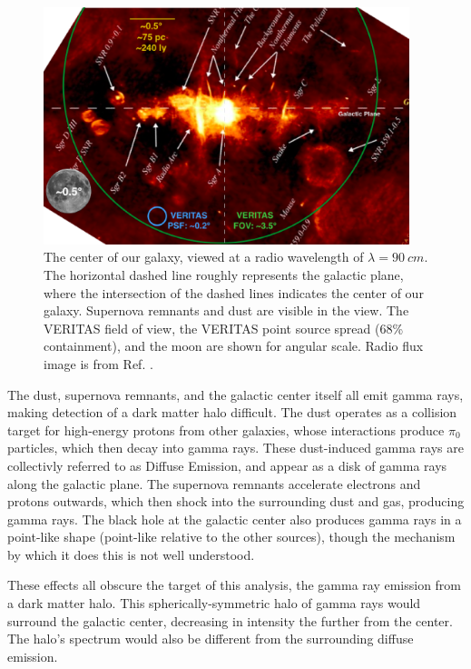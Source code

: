 \begin{figure}[ht]
  \begin{center}
    \includegraphics[width=0.95\textwidth]{images/GalacticCenterInRadio.eps}
    \caption[Galactic Center in Radio]{The center of our galaxy, viewed at a radio wavelength of $\lambda=\SI{90}{cm}$.  The horizontal dashed line roughly represents the galactic plane, where the intersection of the dashed lines indicates the center of our galaxy.  Supernova remnants and dust are visible in the view.  The VERITAS field of view, the VERITAS point source spread (68\% containment), and the moon are shown for angular scale.  Radio flux image is from Ref. \cite{galactic_center_in_radio}.}
  \end{center}
\end{figure}

The dust, supernova remnants, and the galactic center itself all emit gamma rays, making detection of a dark matter halo difficult.
The dust operates as a collision target for high-energy protons from other galaxies, whose interactions produce $\pi_0$ particles, which then decay into gamma rays.
These dust-induced gamma rays are collectivly referred to as Diffuse Emission, and appear as a disk of gamma rays along the galactic plane.
The supernova remnants accelerate electrons and protons outwards, which then shock into the surrounding dust and gas, producing gamma rays.
The black hole at the galactic center also produces gamma rays in a point-like shape (point-like relative to the other sources), though the mechanism by which it does this is not well understood\cite{gal_cent_still_undetermined}.

These effects all obscure the target of this analysis, the gamma ray emission from a dark matter halo.
This spherically-symmetric halo of gamma rays would surround the galactic center, decreasing in intensity the further from the center.
The halo's spectrum would also be different from the surrounding diffuse emission.


